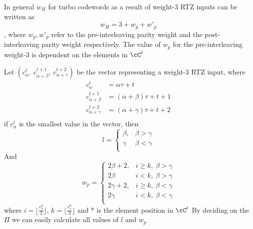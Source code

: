 \documentclass[11pt, oneside, dvipdfmx]{book}
\begin{document}
In general $w_H$ for turbo codewords as a result of weight-$3$ RTZ inputs can be written as $$w_H=3 + w_p+ w'_p$$, where $w_p,w'_p$ refer to the pre-interleaving parity weight and the post-interleaving parity weight respectively. The value of $w_p$ for the pre-interleaving weight-$3$ is dependent on the elements in $\cC^t$

Let $(c_{\alpha}^{t},~c_{\alpha+\beta}^{t+1},~c_{\alpha+\gamma}^{t+2})$ be the vector representing a weight-$3$ RTZ input, where 
\begin{equation}
\begin{split}
c_{\alpha}^{t}&=\alpha\tau+ t\\
c_{\alpha+\beta}^{t+1}&=(\alpha+\beta)\tau+ t+1\\
c_{\alpha+\gamma}^{t+2}&=(\alpha+\gamma)\tau+ t+2\\
\end{split}
\label{eq7}
\end{equation}
if $c_{\alpha}^{t}$ is the smallest value in the vector, then
\begin{equation}
l=
\begin{cases}
\beta ,& \beta>\gamma \\
\gamma & \beta < \gamma\\
\end{cases}
\label{eq8}
\end{equation}
And 
\begin{equation}
w_p=
\begin{cases}
2\beta+2,& i \geq k, ~\beta>\gamma \\
2\beta & i < k, ~\beta>\gamma\\
2\gamma+2,& i \geq k,~ \beta<\gamma \\
2\gamma & i < k, ~\beta<\gamma\\
\end{cases}
\label{eq9}
\end{equation}
where $i=\lfloor\frac{c_*^2}{3}\rfloor$, $k=\lfloor\frac{c_*^0}{3}\rfloor$ and * is the element position in $\cC^t$\newline
By deciding on the $\Pi$ we can easily calculate all values of $l$ and $w_p$
\end{document}
